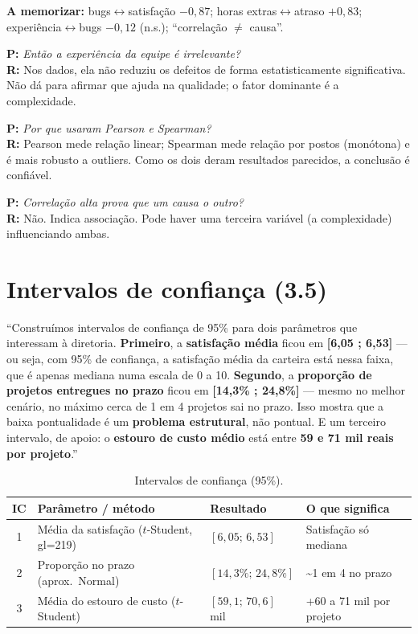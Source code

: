 \documentclass[a4paper, 11pt]{article}
\newcommand{\pergunta}[2]{\par\smallskip\noindent\textbf{P:} \emph{#1}\\
  \textbf{R:} #2}
\begin{document}
\textbf{A memorizar:} bugs$\leftrightarrow$satisfação $-0{,}87$; horas extras$\leftrightarrow$atraso $+0{,}83$;
experiência$\leftrightarrow$bugs $-0{,}12$ (n.s.); ``correlação $\neq$ causa''.

\pergunta{Então a experiência da equipe é irrelevante?}{Nos dados, ela não reduziu os defeitos de forma estatisticamente significativa. Não dá para afirmar que ajuda na qualidade; o fator dominante é a complexidade.}
\pergunta{Por que usaram Pearson \emph{e} Spearman?}{Pearson mede relação linear; Spearman mede relação por postos (monótona) e é mais robusto a outliers. Como os dois deram resultados parecidos, a conclusão é confiável.}
\pergunta{Correlação alta prova que um causa o outro?}{Não. Indica associação. Pode haver uma terceira variável (a complexidade) influenciando ambas.}

\section{Intervalos de confiança (3.5)}

\begin{roteiro}
``Construímos intervalos de confiança de 95\% para dois parâmetros que interessam à diretoria.
\textbf{Primeiro}, a \textbf{satisfação média} ficou em \textbf{[6,05 ; 6,53]} --- ou seja, com
95\% de confiança, a satisfação média da carteira está nessa faixa, que é apenas mediana numa
escala de 0 a 10. \textbf{Segundo}, a \textbf{proporção de projetos entregues no prazo} ficou em
\textbf{[14,3\% ; 24,8\%]} --- mesmo no melhor cenário, no máximo cerca de 1 em 4 projetos sai no
prazo. Isso mostra que a baixa pontualidade é um \textbf{problema estrutural}, não pontual. E um
terceiro intervalo, de apoio: o \textbf{estouro de custo médio} está entre \textbf{59 e 71 mil
reais por projeto}.''
\end{roteiro}

\begin{table}[H]
\centering
\caption{Intervalos de confiança (95\%).}
\begin{tabularx}{\textwidth}{@{} c L l L @{}}
\toprule
\textbf{IC} & \textbf{Parâmetro / método} & \textbf{Resultado} & \textbf{O que significa} \\
 & Média da satisfação ($t$-Student, gl=219) & $[6{,}05;\,6{,}53]$ & Satisfação só mediana \\
2 & Proporção no prazo (aprox.\ Normal) & $[14{,}3\%;\,24{,}8\%]$ & \textasciitilde1 em 4 no prazo \\
3 & Média do estouro de custo ($t$-Student) & $[59{,}1;\,70{,}6]$ mil & +60 a 71 mil por projeto \\
\bottomrule
\end{tabularx}
\end{table}
\end{document}
